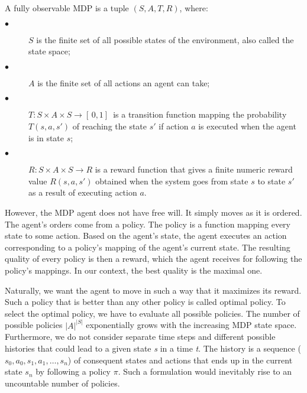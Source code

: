 \begin{definition}\label{def:MDP}
A fully observable MDP is a tuple $(S, A, T, R)$, where:
\begin{description}
  \item[$\bullet$ ] $S$ is the finite set of all possible states of the environment, also called the state space;
  \item[$\bullet$ ] $A$ is the finite set of all actions an agent can take;
  \item[$\bullet$ ] $T : S \times A \times S \rightarrow [ \,0, 1] \,$ is a transition function mapping the probability $T(s, a, s')$ of reaching the state $s'$ if action $a$ is executed when the agent is in state $s$;
  \item[$\bullet$ ] $R : S \times A \times S \rightarrow R$ is a reward function that gives a finite numeric reward value $R(s, a, s')$ obtained when the system goes from state $s$ to state $s'$ as a result of executing action $a$.
\end{description}
\end{definition}

However, the MDP agent does not have free will. It simply moves as it is ordered. The agent's orders come from a policy. The policy is a function mapping every state to some action. Based on the agent's state, the agent executes an action corresponding to a policy's mapping of the agent's current state. The resulting quality of every policy is then a reward, which the agent receives for following the policy's mappings. In our context, the best quality is the maximal one.

Naturally, we want the agent to move in such a way that it maximizes its reward. Such a policy that is better than any other policy is called optimal policy. To select the optimal policy, we have to evaluate all possible policies. The number of possible policies $|A|^{|S|}$ exponentially grows with the increasing MDP state space. Furthermore, we do not consider separate time steps and different possible histories that could lead to a given state \textit{s} in a time \textit{t}. The history is a sequence ($s_0, a_0, s_1, a_1, \ldots, s_n$) of consequent states and actions that ends up in the current state $s_n$ by following a policy $\pi$. Such a formulation would inevitably rise to an uncountable number of policies.

